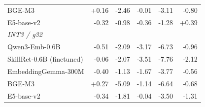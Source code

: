 \begin{table}[t]
\begin{tabular}{lrrrrr}
\quad BGE-M3 & +0.16 & -2.46 & -0.01 & -3.11 & -0.80 \\
\quad E5-base-v2 & -0.32 & -0.98 & -0.36 & -1.28 & +0.39 \\
\multicolumn{6}{l}{\emph{INT3 / g32}} \\
\quad Qwen3-Emb-0.6B & -0.51 & -2.09 & -3.17 & -6.73 & -0.96 \\
\quad SkillRet-0.6B (finetuned) & -0.06 & -2.07 & -3.51 & -7.76 & -2.12 \\
\quad EmbeddingGemma-300M & -0.40 & -1.13 & -1.67 & -3.77 & -0.56 \\
\quad BGE-M3 & +0.27 & -5.09 & -1.14 & -6.64 & -0.68 \\
\quad E5-base-v2 & -0.34 & -1.81 & -0.04 & -3.50 & -1.31 \\
\bottomrule
\end{tabular}\end{table}